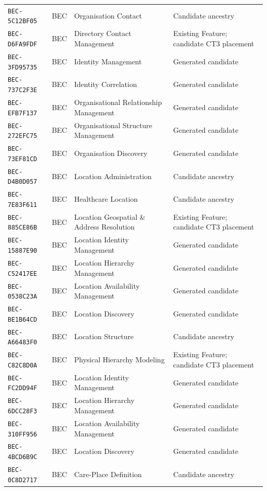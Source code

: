 \documentclass[11pt,a4paper,openany]{book}
\begin{document}
\begin{longtable}{@{}p{.19\linewidth}p{.12\linewidth}p{.39\linewidth}p{.24\linewidth}@{}}
\texttt{BEC-5C12BF05} & BEC & Organisation Contact & Candidate ancestry \\
\texttt{BEC-D6FA9FDF} & BEC & Directory Contact Management & Existing Feature; candidate CT3 placement \\
\texttt{BEC-3FD95735} & BEC & Identity Management & Generated candidate \\
\texttt{BEC-737C2F3E} & BEC & Identity Correlation & Generated candidate \\
\texttt{BEC-EFB7F137} & BEC & Organisational Relationship Management & Generated candidate \\
\texttt{BEC-272EFC75} & BEC & Organisational Structure Management & Generated candidate \\
\texttt{BEC-73EF81CD} & BEC & Organisation Discovery & Generated candidate \\
\texttt{BEC-D4B0D057} & BEC & Location Administration & Candidate ancestry \\
\texttt{BEC-7E83F611} & BEC & Healthcare Location & Candidate ancestry \\
\texttt{BEC-885CE86B} & BEC & Location Geospatial \& Address Resolution & Existing Feature; candidate CT3 placement \\
\texttt{BEC-15887E90} & BEC & Location Identity Management & Generated candidate \\
\texttt{BEC-C52417EE} & BEC & Location Hierarchy Management & Generated candidate \\
\texttt{BEC-0538C23A} & BEC & Location Availability Management & Generated candidate \\
\texttt{BEC-BE1B64CD} & BEC & Location Discovery & Generated candidate \\
\texttt{BEC-A66483F0} & BEC & Location Structure & Candidate ancestry \\
\texttt{BEC-C82C8D0A} & BEC & Physical Hierarchy Modeling & Existing Feature; candidate CT3 placement \\
\texttt{BEC-FC2DD94F} & BEC & Location Identity Management & Generated candidate \\
\texttt{BEC-6DCC28F3} & BEC & Location Hierarchy Management & Generated candidate \\
\texttt{BEC-310FF956} & BEC & Location Availability Management & Generated candidate \\
\texttt{BEC-4BCD6B9C} & BEC & Location Discovery & Generated candidate \\
\texttt{BEC-0C8D2717} & BEC & Care-Place Definition & Candidate ancestry \\

\end{longtable}
\end{document}
